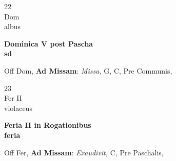 \documentclass[10pt, openany]{book}
\begin{document}
        \begin{center}
            \begin{minipage}{3.5in}
                \vspace{2em}
                \begin{minipage}{0.5in}
                    {\Huge 22} \\
                    {\normalsize Dom} \\
                    {\normalsize albus}
                \end{minipage}
                \begin{minipage}{3.0in}
                    \textbf{ \large Dominica V post Pascha \\
                    \textnormal{\normalsize sd}} \\ 
                \end{minipage}
                \begin{justify}Off Dom, \textbf{Ad Missam}: \textit{Missa,} G, C, Pre Communis,   
                \end{justify}
            \end{minipage}
        \end{center}
    
        \begin{center}
            \begin{minipage}{3.5in}
                \vspace{2em}
                \begin{minipage}{0.5in}
                    {\Huge 23} \\
                    {\normalsize Fer II} \\
                    {\normalsize violaceus}
                \end{minipage}
                \begin{minipage}{3.0in}
                    \textbf{ \large Feria II in Rogationibus \\
                    \textnormal{\normalsize feria}} \\ 
                \end{minipage}
                \begin{justify}Off Fer, \textbf{Ad Missam}: \textit{Exaudivit,} C, Pre Paschalis,   
                \end{justify}
            \end{minipage}
        \end{center}
    
\end{document}
